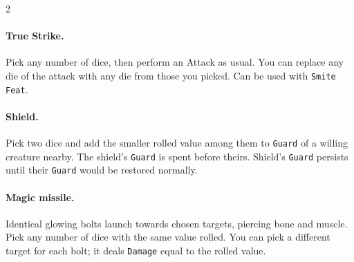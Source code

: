 \begin{multicols*}{2}
\paragraph{True Strike.}
Pick any number of dice, then perform an Attack as usual.
You can replace any die of the attack with any die from those you picked.
Can be used with \texttt{Smite} \texttt{Feat}.

\paragraph{Shield.} Pick two dice and add the smaller rolled value among them to \texttt{Guard} of a willing creature nearby.
 The shield's \texttt{Guard} is spent before theirs.
 Shield's \texttt{Guard} persists until their \texttt{Guard} would be restored normally.

\paragraph{Magic missile.}
Identical glowing bolts launch towards chosen targets, piercing bone and muscle.
Pick any number of dice with the same value rolled.
You can pick a different target for each bolt; it deals \texttt{Damage} equal to the rolled value.

\end{multicols*}